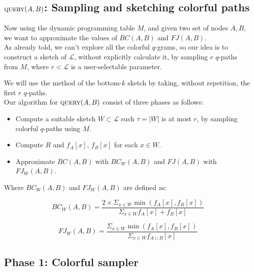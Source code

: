 \subsection*{$\textsc{query}(A,B)$: Sampling and sketching colorful paths}

Now using the dynamic programming table $M$, and given two set of nodes $A, B$, 
we want to approximate the values of $BC(A,B)$ and $FJ(A,B)$.\\

As already told, we can't explore all the colorful $q$-grams, so our idea is to 
construct a sketch of $\mathcal{L}$, without explicitly calculate it, 
by sampling $r$ $q$-paths from $M$, where $r < \mathcal{L}$ is a user-selectable parameter.

We will use the method of the bottom-$k$ sketch by taking, without repetition, the first $r$ $q$-paths. \\

Our algorithm for $\textsc{query}(A,B)$ consist of three phases as follows:

\begin{itemize}
	\item Compute a suitable sketch $W \subset \mathcal{L}$ such $\tau = |W|$ is at most $r$, by sampling colorful $q$-paths using $M$.
	\item Compute $R$ and $f_{A}[x]$, $f_{B}[x]$ for each $x \in W$.
	\item Approximate $BC(A,B)$ with $BC_{W}(A,B)$ and $FJ(A,B)$ with $FJ_{W}(A,B)$.
\end{itemize}

Where $BC_{W}(A,B)$ and $FJ_{W}(A,B)$ are defined as:

\begin{equation}		
	BC_{W}(A,B) = \frac{ 2 \times \Sigma_{x \in W} \min(f_{A}[x], f_{B}[x]) }{ \Sigma_{x \in W} f_{A}[x] + f_{B}[x] }
\end{equation}

\begin{equation}	
	FJ_{W}(A,B) = \frac{ \Sigma_{x \in W} \min(f_{A}[x], f_{B}[x]) }{ \Sigma_{x \in W} f_{A \cup B}[x] }
\end{equation}

\subsection*{Phase 1: Colorful sampler}
